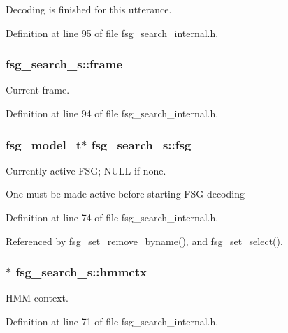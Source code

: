 \-Decoding is finished for this utterance. 



\-Definition at line 95 of file fsg\-\_\-search\-\_\-internal.\-h.

\subsubsection[{frame}]{ {\bf fsg\-\_\-search\-\_\-s\-::frame}}\label{structfsg__search__s_acdac4164d14d531b14c11a823dd22893}


\-Current frame. 



\-Definition at line 94 of file fsg\-\_\-search\-\_\-internal.\-h.

\subsubsection[{fsg}]{\setlength{\rightskip}{0pt plus 5cm}fsg\-\_\-model\-\_\-t$\ast$ {\bf fsg\-\_\-search\-\_\-s\-::fsg}}\label{structfsg__search__s_ab1877ffe7d77ddb79bab53fb95577946}


\-Currently active \-F\-S\-G; \-N\-U\-L\-L if none. 

\-One must be made active before starting \-F\-S\-G decoding 

\-Definition at line 74 of file fsg\-\_\-search\-\_\-internal.\-h.



\-Referenced by fsg\-\_\-set\-\_\-remove\-\_\-byname(), and fsg\-\_\-set\-\_\-select().

\subsubsection[{hmmctx}]{$\ast$ {\bf fsg\-\_\-search\-\_\-s\-::hmmctx}}\label{structfsg__search__s_a7407bdf5f311caf9d46817b3387b798c}


\-H\-M\-M context. 



\-Definition at line 71 of file fsg\-\_\-search\-\_\-internal.\-h.

